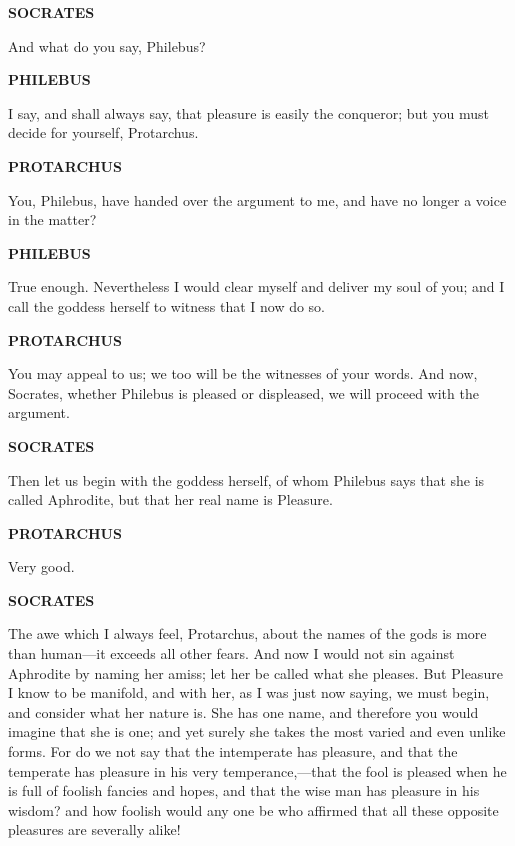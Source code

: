 \documentclass[11pt,letter]{article}
\begin{document}
\par \textbf{SOCRATES}
\par   And what do you say, Philebus?

\par \textbf{PHILEBUS}
\par   I say, and shall always say, that pleasure is easily the conqueror; but you must decide for yourself, Protarchus.

\par \textbf{PROTARCHUS}
\par   You, Philebus, have handed over the argument to me, and have no longer a voice in the matter?

\par \textbf{PHILEBUS}
\par   True enough. Nevertheless I would clear myself and deliver my soul of you; and I call the goddess herself to witness that I now do so.

\par \textbf{PROTARCHUS}
\par   You may appeal to us; we too will be the witnesses of your words. And now, Socrates, whether Philebus is pleased or displeased, we will proceed with the argument.

\par \textbf{SOCRATES}
\par   Then let us begin with the goddess herself, of whom Philebus says that she is called Aphrodite, but that her real name is Pleasure.

\par \textbf{PROTARCHUS}
\par   Very good.

\par \textbf{SOCRATES}
\par   The awe which I always feel, Protarchus, about the names of the gods is more than human—it exceeds all other fears. And now I would not sin against Aphrodite by naming her amiss; let her be called what she pleases. But Pleasure I know to be manifold, and with her, as I was just now saying, we must begin, and consider what her nature is. She has one name, and therefore you would imagine that she is one; and yet surely she takes the most varied and even unlike forms. For do we not say that the intemperate has pleasure, and that the temperate has pleasure in his very temperance,—that the fool is pleased when he is full of foolish fancies and hopes, and that the wise man has pleasure in his wisdom? and how foolish would any one be who affirmed that all these opposite pleasures are severally alike!
\end{document}
